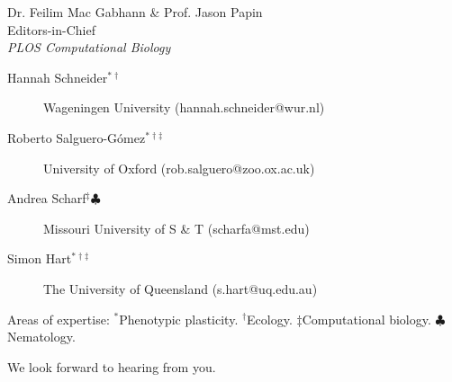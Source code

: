 \documentclass[11pt]{letter} %
\begin{document}
\begin{letter}{Dr. Feilim Mac Gabhann \& Prof. Jason Papin \\ Editors-in-Chief \\ \emph{PLOS Computational Biology}}
\begin{description}
    \item[Hannah Schneider$^{\ast\dag}$] 
    Wageningen University
    (hannah.schneider@wur.nl)

    \item[Roberto Salguero-Gómez$^{\ast\dag\ddag}$] 
     University of Oxford
    (rob.salguero@zoo.ox.ac.uk)
    


    \item[Andrea Scharf$^{\ddag}\clubsuit$] 
    Missouri University of S \& T 
    (scharfa@mst.edu)




    \item[Simon Hart$^{\ast\dag\ddag}$] 
    The University of Queensland 
    (s.hart@uq.edu.au)
    


    
\end{description}

Areas of expertise: $^\ast$Phenotypic plasticity.
$^\dag$Ecology.
$\ddag$Computational biology.
$\clubsuit$Nematology.

\normalsize

\vspace{2\parskip}




We look forward to hearing from you.

\vspace{2\parskip} %


\end{letter}
\end{document}
